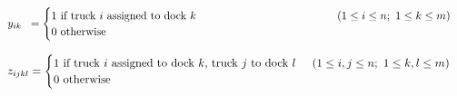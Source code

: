 \documentclass[preprint,12pt,authoryear]{elsarticle}
\begin{document}
    $y_{ik} \hspace{2mm} = 
      \begin{cases} 
        1  \ \text{if truck $i$ assigned to dock $k$}  \hspace{45mm} (1\le i \le n;\ 1\le k \le m) \\ 
        0  \  \text{otherwise} 
      \end{cases}$ 
\smallskip

    $z_{ijkl} = 
    \begin{cases} 
      1 \ \text{if truck $i$ assigned to dock $k$, truck $j$  to dock $l$} \hspace{5mm} (1\le i,j \le n;\ 1\le k,l \le m)\\ 
       0  \ \text{otherwise} 
     \end{cases}$
\bigskip
\end{document}
